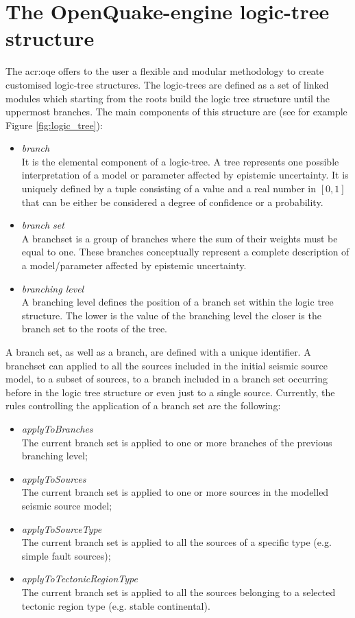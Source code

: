 \section{The OpenQuake-engine logic-tree structure}
The \gls{acr:oqe}  offers to the user a flexible and modular methodology 
to create customised logic-tree structures. 
%
The logic-trees are defined as a set of linked modules which starting from the 
roots build the logic tree structure until the uppermost branches. The main 
components of this structure are (see for example Figure \ref{fig:logic_tree}):
\begin{itemize}
    \item \emph{branch} \hfill \\
        It is the elemental component of a logic-tree. A tree
        represents one possible interpretation of a model or parameter 
        affected by epistemic uncertainty. It is uniquely defined by a tuple
        consisting of a value and a real number in $[0,1]$ that can be either
        be considered a degree of confidence or a probability.
    \item \emph{branch set} \hfill \\
        A \gls{branchset} is a group of branches where the sum
        of their weights must be equal to one. These branches conceptually 
        represent a complete description of a model/parameter affected by 
        epistemic uncertainty. 
    \item \emph{branching level} \hfill \\
        A branching level defines the position of a 
        branch set within the logic tree structure. The lower is the value of
        the branching level the closer is the branch set to the roots of 
        the tree.
\end{itemize}
A branch set, as well as a \gls{branch}, are defined with a unique 
identifier. 
%
A \gls{branchset} can applied to all the sources included in the initial 
seismic source model, to a subset of sources, to a branch included in a 
branch set occurring before in the logic tree structure or even just to 
a single source. Currently, the rules controlling the application of a 
branch set are the following:
\begin{itemize}
    \item \emph{applyToBranches} \hfill \\
        The current branch set is applied to one 
        or more branches of the previous branching level;
    \item \emph{applyToSources} \hfill \\
        The current branch set is applied to 
        one or more sources in the modelled seismic source model;
    \item \emph{applyToSourceType} \hfill \\
        The current branch set is applied to 
        all the sources of a specific type (e.g. simple fault sources);
    \item \emph{applyToTectonicRegionType} \hfill \\
        The current branch set is applied to all the sources belonging 
        to a selected tectonic region type (e.g. stable continental).
\end{itemize}

